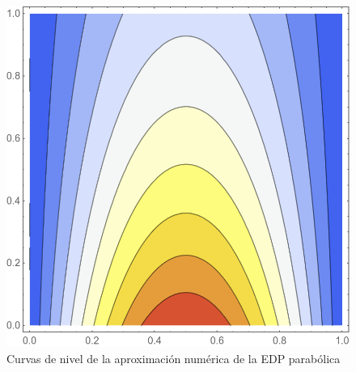 \documentclass[a4paper]{article}
\begin{document}
\begin{figure}[H]
\begin{center}
\includegraphics[scale=0.29]{./parabolic_contour.png} 
\end{center} 
\caption{Curvas de nivel de la aproximación numérica de la EDP parabólica}
\label{fig::fig6}
\end{figure}
\end{document}

